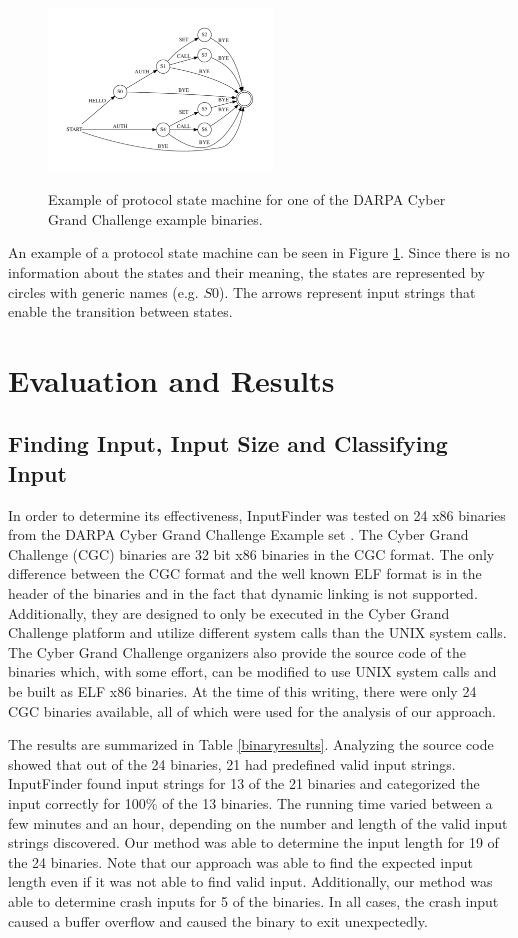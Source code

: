 \documentclass{sig-alternate-05-2015}
\def \tool {InputFinder}
\def \numbinaries {24}
\begin{document}
\begin{figure}[h!]
\caption{Example of protocol state machine for one of the DARPA Cyber Grand Challenge example binaries.}
\centering
\includegraphics[width=0.53\textwidth]{protocoldiagram.pdf}
\label{fig:psm_example}
\end{figure}

An example of a protocol state machine can be seen in Figure \ref{fig:psm_example}.
Since there is no information about the states and their meaning, the states are represented by circles with generic names (e.g. $S0$).
The arrows represent input strings that enable the transition between states.

\section{Evaluation and Results} \label{results}
\subsection{Finding Input, Input Size and Classifying Input}
In order to determine its effectiveness, \tool{} was tested on \numbinaries{} x86 binaries from the DARPA Cyber Grand Challenge Example set \cite{darpacgc}.
The Cyber Grand Challenge (CGC) binaries are 32 bit x86 binaries in the CGC format.
The only difference between the CGC format and the well known ELF format is in the header of the binaries and in the fact that dynamic linking is not supported.
Additionally, they are designed to only be executed in the Cyber Grand Challenge platform and utilize different system calls than the UNIX system calls.
The Cyber Grand Challenge organizers also provide the source code of the binaries which, with some effort, can be modified to use UNIX system calls and be built as ELF x86 binaries.
At the time of this writing, there were only 24 CGC binaries available, all of which were used for the analysis of our approach.

The results are summarized in Table \ref{binaryresults}.
Analyzing the source code showed that out of the \numbinaries{} binaries, 21 had predefined valid input strings.
\tool{} found input strings for 13 of the 21 binaries and categorized the input correctly for 100\% of the 13 binaries.
The running time varied between a few minutes and an hour, depending on the number and length of the valid input strings discovered.
Our method was able to determine the input length for 19 of the 24 binaries.
Note that our approach was able to find the expected input length even if it was not able to find valid input.
Additionally, our method was able to determine crash inputs for 5 of the binaries.
In all cases, the crash input caused a buffer overflow and caused the binary to exit unexpectedly.
\end{document}
